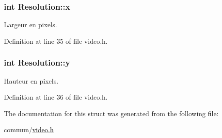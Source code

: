 \hypertarget{structResolution_a6aff06d878fdbd0bbb681e02adc94c0f}{
\subsubsection[{x}]{\setlength{\rightskip}{0pt plus 5cm}int Resolution\-::x}}\label{structResolution_a6aff06d878fdbd0bbb681e02adc94c0f}
Largeur en pixels. 

Definition at line 35 of file video.\-h.

\hypertarget{structResolution_a68fe6f35cf8c0e03898a2d9888dd3d0d}{
\subsubsection[{y}]{\setlength{\rightskip}{0pt plus 5cm}int Resolution\-::y}}\label{structResolution_a68fe6f35cf8c0e03898a2d9888dd3d0d}
Hauteur en pixels. 

Definition at line 36 of file video.\-h.



The documentation for this struct was generated from the following file\-:\begin{DoxyCompactItemize}
\item 
commun/\hyperlink{video_8h}{video.\-h}\end{DoxyCompactItemize}
